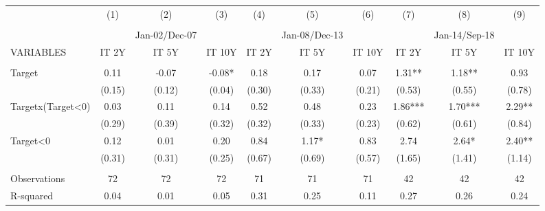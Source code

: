 \begin{tabular}{lccccccccc} \hline
 & (1) & (2) & (3) & (4) & (5) & (6) & (7) & (8) & (9) \\
 &  &  &  &  &  &  &  &  &  \\
 &  & Jan-02/Dec-07 &  &  & Jan-08/Dec-13 &  &  & Jan-14/Sep-18 &  \\
VARIABLES & IT 2Y & IT 5Y & IT 10Y & IT 2Y & IT 5Y & IT 10Y & IT 2Y & IT 5Y & IT 10Y \\ \hline
 &  &  &  &  &  &  &  &  &  \\
Target & 0.11 & -0.07 & -0.08* & 0.18 & 0.17 & 0.07 & 1.31** & 1.18** & 0.93 \\
 & (0.15) & (0.12) & (0.04) & (0.30) & (0.33) & (0.21) & (0.53) & (0.55) & (0.78) \\
Targetx(Target<0) & 0.03 & 0.11 & 0.14 & 0.52 & 0.48 & 0.23 & 1.86*** & 1.70*** & 2.29** \\
 & (0.29) & (0.39) & (0.32) & (0.32) & (0.33) & (0.23) & (0.62) & (0.61) & (0.84) \\
Target<0 & 0.12 & 0.01 & 0.20 & 0.84 & 1.17* & 0.83 & 2.74 & 2.64* & 2.40** \\
 & (0.31) & (0.31) & (0.25) & (0.67) & (0.69) & (0.57) & (1.65) & (1.41) & (1.14) \\
 &  &  &  &  &  &  &  &  &  \\
Observations & 72 & 72 & 72 & 71 & 71 & 71 & 42 & 42 & 42 \\
 R-squared & 0.04 & 0.01 & 0.05 & 0.31 & 0.25 & 0.11 & 0.27 & 0.26 & 0.24 \\ \hline
\end{tabular}
